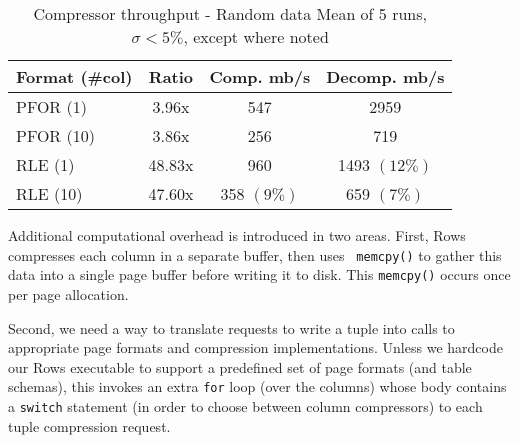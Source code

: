 \documentclass{sig-alternate-sigmod08}
\newcommand{\rows}{Rows\xspace}
\begin{document}



\begin{table}
\caption{Compressor throughput - Random data Mean of 5 runs, $\sigma<5\%$, except where noted}
\centering
\label{table:perf}
\begin{tabular}{|l|c|c|c|} \hline
Format (\#col)    & Ratio & Comp. mb/s & Decomp. mb/s\\ \hline %
PFOR (1)      &    3.96x  &  547  &    2959 \\ \hline %
PFOR (10)     &    3.86x  &  256 &      719 \\ \hline %
RLE (1)       &   48.83x  &  960  &    1493 $(12\%)$ \\ \hline %
RLE (10)      &   47.60x  &  358 $(9\%)$ & 659 $(7\%)$ \\  %
\hline\end{tabular}
\end{table}


Additional computational overhead is introduced in two areas.  First,
\rows compresses each column in a separate buffer, then uses {\tt
  memcpy()} to gather this data into a single page buffer before
writing it to disk.  This {\tt memcpy()} occurs once per page
allocation.

Second, we need a way to translate requests to write a tuple into
calls to appropriate page formats and compression implementations.
Unless we hardcode our \rows executable to support a predefined set of
page formats (and table schemas), this invokes an extra {\tt for} loop
(over the columns) whose body contains a {\tt switch} statement (in
order to choose between column compressors) to each tuple compression
request.
\end{document}
